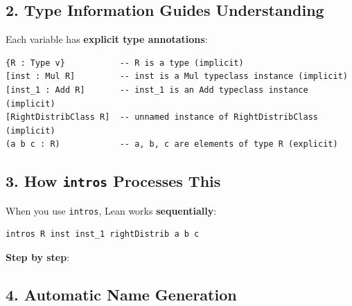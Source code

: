 \documentclass{amsart}
\theoremstyle{plain}
\theoremstyle{definition}
\theoremstyle{remark}
\begin{document}
\subsection{\textbf{2. Type Information Guides Understanding}}

Each variable has \textbf{explicit type annotations}:

\begin{lstlisting}[language=lean]
{R : Type v}           -- R is a type (implicit)
[inst : Mul R]         -- inst is a Mul typeclass instance (implicit)
[inst_1 : Add R]       -- inst_1 is an Add typeclass instance (implicit)
[RightDistribClass R]  -- unnamed instance of RightDistribClass (implicit)
(a b c : R)            -- a, b, c are elements of type R (explicit)
\end{lstlisting}

\subsection{\textbf{3. How \lstinline{intros} Processes This}}

When you use \lstinline{intros}, Lean works \textbf{sequentially}:

\begin{lstlisting}[language=lean]
intros R inst inst_1 rightDistrib a b c
\end{lstlisting}
\textbf{Step by step}:



\subsection{\textbf{4. Automatic Name Generation}}
\end{document}
